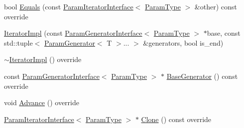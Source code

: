 \begin{DoxyCompactItemize}
\item 
bool \mbox{\hyperlink{classtesting_1_1internal_1_1_cartesian_product_generator_1_1_iterator_impl_3_01_index_sequence_3_01_i_8_8_8_01_4_01_4_a7ba6129ccd025c1cb0e00fe71b8c8489}{Equals}} (const \mbox{\hyperlink{classtesting_1_1internal_1_1_param_iterator_interface}{Param\+Iterator\+Interface}}$<$ \mbox{\hyperlink{classtesting_1_1internal_1_1_cartesian_product_generator_af27131157a9347f0c82420ca081ee7dd}{Param\+Type}} $>$ \&other) const override
\item 
\mbox{\hyperlink{classtesting_1_1internal_1_1_cartesian_product_generator_1_1_iterator_impl_3_01_index_sequence_3_01_i_8_8_8_01_4_01_4_a3c28d20b4527f146a97c5490326f869f}{Iterator\+Impl}} (const \mbox{\hyperlink{classtesting_1_1internal_1_1_param_generator_interface}{Param\+Generator\+Interface}}$<$ \mbox{\hyperlink{classtesting_1_1internal_1_1_cartesian_product_generator_af27131157a9347f0c82420ca081ee7dd}{Param\+Type}} $>$ $\ast$base, const std\+::tuple$<$ \mbox{\hyperlink{classtesting_1_1internal_1_1_param_generator}{Param\+Generator}}$<$ T $>$... $>$ \&generators, bool is\+\_\+end)
\item 
\mbox{\hyperlink{classtesting_1_1internal_1_1_cartesian_product_generator_1_1_iterator_impl_3_01_index_sequence_3_01_i_8_8_8_01_4_01_4_adf6a47392283d7e236b604f487cf8cfc}{$\sim$\+Iterator\+Impl}} () override
\item 
const \mbox{\hyperlink{classtesting_1_1internal_1_1_param_generator_interface}{Param\+Generator\+Interface}}$<$ \mbox{\hyperlink{classtesting_1_1internal_1_1_cartesian_product_generator_af27131157a9347f0c82420ca081ee7dd}{Param\+Type}} $>$ $\ast$ \mbox{\hyperlink{classtesting_1_1internal_1_1_cartesian_product_generator_1_1_iterator_impl_3_01_index_sequence_3_01_i_8_8_8_01_4_01_4_a8fa3ea322a1348fc8065481aba76e860}{Base\+Generator}} () const override
\item 
void \mbox{\hyperlink{classtesting_1_1internal_1_1_cartesian_product_generator_1_1_iterator_impl_3_01_index_sequence_3_01_i_8_8_8_01_4_01_4_a167e8b38118c8635d5849daf924a517b}{Advance}} () override
\item 
\mbox{\hyperlink{classtesting_1_1internal_1_1_param_iterator_interface}{Param\+Iterator\+Interface}}$<$ \mbox{\hyperlink{classtesting_1_1internal_1_1_cartesian_product_generator_af27131157a9347f0c82420ca081ee7dd}{Param\+Type}} $>$ $\ast$ \mbox{\hyperlink{classtesting_1_1internal_1_1_cartesian_product_generator_1_1_iterator_impl_3_01_index_sequence_3_01_i_8_8_8_01_4_01_4_a0b434e09b32dfd6b444085cf95dc22ab}{Clone}} () const override

\end{DoxyCompactItemize}
